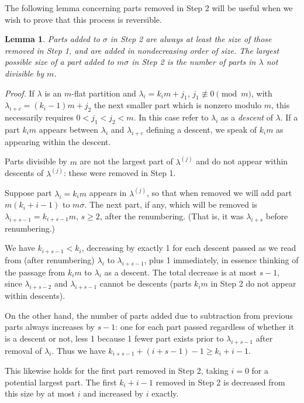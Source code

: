 \documentclass{amsart}
\newtheorem{lemma}{Lemma}
\begin{document}
The following lemma concerning parts removed in Step 2 will be useful when we wish to prove that this process is reversible.

\begin{lemma}\label{AngleLemma} Parts added to $\sigma$ in Step 2 are always at least the size of those removed in Step 1, and are added in nondecreasing order of size.  The largest possible size of a part added to $m\sigma$ in Step 2 is the number of parts in $\lambda$ not divisible by $m$.
\end{lemma}

\emph{Proof.} If $\lambda$ is an $m$-flat partition and $\lambda_i = k_im+j_1$, $j_1 \not\equiv 0 \pmod{m}$, with $\lambda_{i+c} = (k_i-1)m+j_2$ the next smaller part which is nonzero modulo $m$, this necessarily requires $0 < j_1 < j_2 < m$.  In this case refer to $\lambda_i$ as a \emph{descent} of $\lambda$.  If a part $k_i m$ appears between $\lambda_i$ and $\lambda_{i+c}$ defining a descent, we speak of $k_i m$ as appearing within the descent.

Parts divisible by $m$ are not the largest part of $\lambda^{(j)}$ and do not appear within descents of $\lambda^{(j)}$: these were removed in Step 1.

Suppose part $\lambda_i = k_im$ appears in $\lambda^{(j)}$, so that when removed we will add part $m(k_i+i-1)$ to $m\sigma$.  The next part, if any, which will be removed is $\lambda_{i+s-1} = k_{i+s-1}m$, $s\geq 2$, after the renumbering.  (That is, it was $\lambda_{i+s}$ before renumbering.)

We have $k_{i+s-1} < k_i$, decreasing by exactly 1 for each descent passed as we read from (after renumbering) $\lambda_i$ to $\lambda_{i+s-1}$, plus 1 immediately, in essence thinking of the passage from $k_im$ to $\lambda_i$ as a descent.  The total decrease is at most $s-1$, since $\lambda_{i+s-2}$ and $\lambda_{i+s-1}$ cannot be descents (parts $k_i m$ in Step 2 do not appear within descents).

On the other hand, the number of parts added due to subtraction from previous parts always increases by $s-1$: one for each part passed regardless of whether it is a descent or not, less 1 because 1 fewer part exists prior to $\lambda_{i+s-1}$ after removal of $\lambda_i$.  Thus we have $k_{i+s-1}+(i+s-1)-1 \geq k_i+i-1$.

This likewise holds for the first part removed in Step 2, taking $i=0$ for a potential largest part.  The first $k_i+i-1$ removed in Step 2 is decreased from this size by at most $i$ and increased by $i$ exactly.
\end{document}
